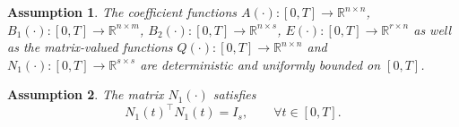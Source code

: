 \documentclass[10pt,a4paper]{amsart}
\newtheorem{ass}{Assumption}
\begin{document}
\begin{ass}\label{ass:2.1}
	The coefficient functions $A(\cdot) : [0,T] \rightarrow \mathbb{R}^{n \times n}$, $B_1(\cdot) : [0,T] \rightarrow \mathbb{R}^{n \times m}$, $B_2(\cdot) : [0,T] \rightarrow \mathbb{R}^{n \times s}$, $E(\cdot) : [0,T] \rightarrow \mathbb{R}^{r \times n}$ as well as the matrix-valued functions $Q(\cdot) : [0,T] \rightarrow \mathbb{R}^{n \times n}$ and $N_1(\cdot) : [0,T] \rightarrow \mathbb{R}^{s \times s}$ are deterministic and uniformly bounded on $[0,T]$.
\end{ass}

\begin{ass}\label{ass:2.4}
	The matrix $N_1(\cdot)$ satisfies
	\[
	N_1(t)^{\top}N_1(t) = I_s,\qquad \forall t \in [0,T].
	\]
\end{ass}
\end{document}
